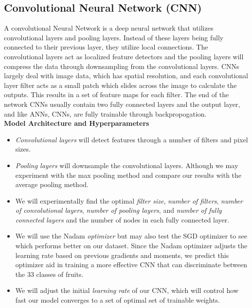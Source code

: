\documentclass[11pt]{article}
\begin{document}
\subsection{Convolutional Neural Network (CNN)} 
A convolutional Neural Network is a deep neural network that utilizes convolutional layers and pooling layers. Instead of these layers being fully connected to their previous layer, they utilize local connections.  The convolutional layers act as localized feature detectors and the pooling layers will compress the data through downsampling from the convolutional layers. CNNs largely deal with image data, which has spatial resolution, and each convolutional layer filter acts as a small patch which slides across the image to calculate the outputs. This results in a set of feature maps for each filter. The end of the network CNNs usually contain two fully connected layers and the output layer, and like ANNs, CNNs, are fully trainable through backpropogation. \hfill\\


\textbf{Model Architecture and Hyperparameters} 
\begin{itemize}
    \item \emph{Convolutional layers} will detect features through a number of filters and pixel sizes.
    \item \emph{Pooling layers} will downsample the convolutional layers. Although we may experiment with the max pooling method and compare our results with the average pooling method. 
    \item We will experimentally find the optimal \emph{filter size}, \emph{number of filters}, \emph{number of convolutional layers}, \emph{number of pooling layers}, and \emph{number of fully connected layers} and the number of nodes in each fully connected layer.
    \item We will use the Nadam \emph{optimizer} but may also test the SGD optimizer to see which performs better on our dataset. Since the Nadam optimizer adjusts the learning rate based on previous gradients and moments, we predict this optimizer aid in training a more effective CNN that can discriminate between the 33 classes of fruits.
    \item We will adjust the initial \emph{learning rate} of our CNN, which will control how fast our model converges to a set of optimal set of trainable weights.
\end{itemize}
\end{document}
